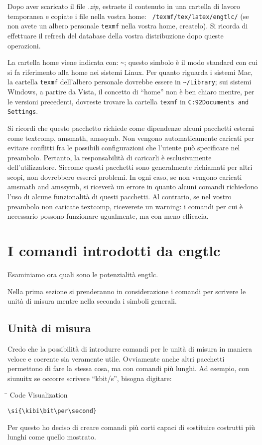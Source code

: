 \documentclass[11pt,a4paper,openany]{book}
\newcommand*{\meta}[1]{{\normalfont\textlangle\textit{#1}\textrangle}}
\begin{document}
Dopo aver scaricato il file \emph{.zip}, estraete il contenuto in una cartella di lavoro temporanea e copiate i file nella vostra home: \texttt{~/texmf/tex/latex/engtlc/} (se non avete un albero personale \texttt{texmf} nella vostra home, createlo). Si ricorda di effettuare il refresh del database della vostra distribuzione dopo queste operazioni.

La cartella home viene indicata con: \texttt{\textasciitilde}; questo simbolo è il modo standard con cui si fa riferimento alla home nei sistemi Linux. Per quanto riguarda i sistemi Mac, la cartella \texttt{texmf} dell'albero personale dovrebbe essere in \texttt{\textasciitilde/Library}; sui sistemi Windows, a partire da Vista, il concetto di ``home'' non è ben chiaro mentre, per le versioni precedenti, dovreste trovare la cartella \texttt{texmf} in \texttt{C:\char92Documents and Settings\char92\meta{nome-utente}}.

Si ricordi che questo pacchetto richiede come dipendenze alcuni pacchetti esterni come  \textsf{textcomp}, \textsf{amsmath}, \textsf{amssymb}. Non vengono automaticamente caricati per evitare conflitti fra le possibili configurazioni che l'utente può specificare nel preambolo. Pertanto, la responsabilità di caricarli è esclusivamente dell'utilizzatore. Siccome questi pacchetti sono generalmente richiamati per altri scopi, non dovrebbero esserci problemi. In ogni caso, se non vengono caricati \textsf{amsmath} and \textsf{amssymb}, si riceverà un errore in quanto alcuni comandi richiedono l'uso di alcune funzionalità di questi pacchetti. Al contrario, se nel vostro preambolo non caricate \textsf{textcomp}, riceverete un warning: i comandi per cui è necessario possono funzionare ugualmente, ma con meno efficacia.

\chapter{I comandi introdotti da \textsf{engtlc}}\label{chap:comandi}
Esaminiamo ora quali sono le potenzialità \textsf{engtlc}.

Nella prima sezione si prenderanno in considerazione i comandi per scrivere le unità di misura mentre nella seconda i simboli generali.

\section{Unità di misura}
Credo che la possibilità di introdurre comandi per le unità di misura in maniera veloce e coerente sia veramente utile. Ovviamente anche altri pacchetti permettono di fare la stessa cosa, ma con comandi più lunghi. Ad esempio, con \textsf{siunuitx} se occorre scrivere ``kbit/s'', bisogna digitare:
\begin{tabbing}
\hspace{7cm}\= \kill
Code \> Visualization \\ 
\begin{lstlisting}
\si{\kibi\bit\per\second}
\end{lstlisting}  \> \kbits
\end{tabbing} 
Per questo ho deciso di creare comandi più corti capaci di sostituire costrutti più lunghi come quello mostrato.
\end{document}
